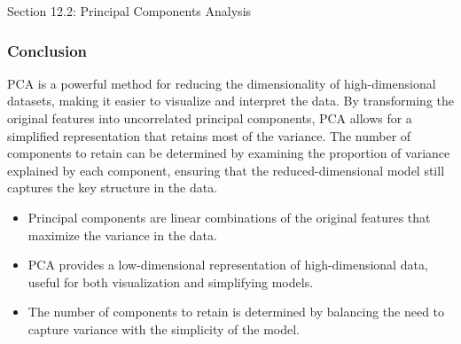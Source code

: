\begin{notes}{Section 12.2: Principal Components Analysis}
    \subsubsection*{Conclusion}
    
    PCA is a powerful method for reducing the dimensionality of high-dimensional datasets, making it easier to visualize and interpret the data. By transforming the original features into uncorrelated principal components, 
    PCA allows for a simplified representation that retains most of the variance. The number of components to retain can be determined by examining the proportion of variance explained by each component, ensuring that 
    the reduced-dimensional model still captures the key structure in the data.
    
    \begin{highlight}
        \begin{itemize}
            \item Principal components are linear combinations of the original features that maximize the variance in the data.
            \item PCA provides a low-dimensional representation of high-dimensional data, useful for both visualization and simplifying models.
            \item The number of components to retain is determined by balancing the need to capture variance with the simplicity of the model.
        \end{itemize}
    \end{highlight}
\end{notes}